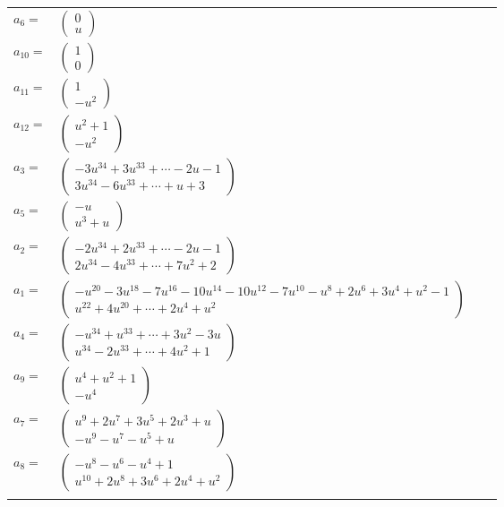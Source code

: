 \documentclass[1p]{elsarticle_modified}
\theoremstyle{definition}
\begin{document}
\begin{tabular}{m{7pt} m{180pt} m{7pt} m{180pt} }
\flushright $a_{6}=$&$\begin{pmatrix}0\\u\end{pmatrix}$ \\
\flushright $a_{10}=$&$\begin{pmatrix}1\\0\end{pmatrix}$ \\
\flushright $a_{11}=$&$\begin{pmatrix}1\\- u^2\end{pmatrix}$ \\
\flushright $a_{12}=$&$\begin{pmatrix}u^2+1\\- u^2\end{pmatrix}$ \\
\flushright $a_{3}=$&$\begin{pmatrix}-3 u^{34}+3 u^{33}+\cdots-2 u-1\\3 u^{34}-6 u^{33}+\cdots+u+3\end{pmatrix}$ \\
\flushright $a_{5}=$&$\begin{pmatrix}- u\\u^3+u\end{pmatrix}$ \\
\flushright $a_{2}=$&$\begin{pmatrix}-2 u^{34}+2 u^{33}+\cdots-2 u-1\\2 u^{34}-4 u^{33}+\cdots+7 u^2+2\end{pmatrix}$ \\
\flushright $a_{1}=$&$\begin{pmatrix}- u^{20}-3 u^{18}-7 u^{16}-10 u^{14}-10 u^{12}-7 u^{10}- u^8+2 u^6+3 u^4+u^2-1\\u^{22}+4 u^{20}+\cdots+2 u^4+u^2\end{pmatrix}$ \\
\flushright $a_{4}=$&$\begin{pmatrix}- u^{34}+u^{33}+\cdots+3 u^2-3 u\\u^{34}-2 u^{33}+\cdots+4 u^2+1\end{pmatrix}$ \\
\flushright $a_{9}=$&$\begin{pmatrix}u^4+u^2+1\\- u^4\end{pmatrix}$ \\
\flushright $a_{7}=$&$\begin{pmatrix}u^9+2 u^7+3 u^5+2 u^3+u\\- u^9- u^7- u^5+u\end{pmatrix}$ \\
\flushright $a_{8}=$&$\begin{pmatrix}- u^8- u^6- u^4+1\\u^{10}+2 u^8+3 u^6+2 u^4+u^2\end{pmatrix}$\\&\end{tabular}
\end{document}
